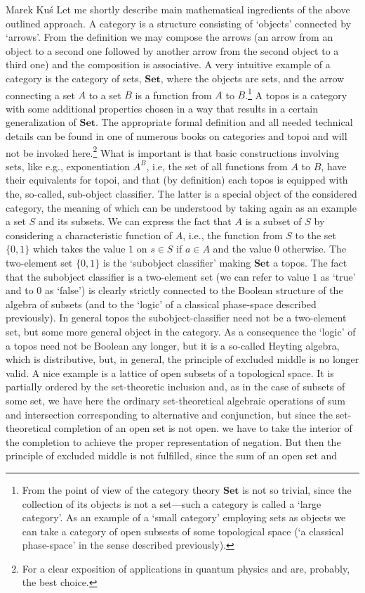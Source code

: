 \begin{artengenv}{Marek Ku\'s}
Let me shortly describe main mathematical ingredients of the above outlined approach. A category is a structure consisting of `objects' connected by `arrows'. From the definition we may compose the arrows (an arrow from an object to a second one followed by another arrow from the second object to a third one) and the composition is associative. A very intuitive example of a category is the category of sets, $\mathbf{Set}$, where the objects are sets, and the arrow connecting a set $A$ to a set $B$ is a function from $A$ to $B$.\footnote{From the point of view of the category theory $\mathbf{Set}$ is not so trivial, since the collection of its objects is not a set---such a category is called a `large category'. As an example of a `small category' employing sets as objects we can take a category of open subsests of some topological space (`a classical phase-space' in the sense described previously). } A topos is a category with some additional properties chosen in a way that results in a certain generalization of $\mathbf{Set}$. The appropriate formal definition and all needed technical details can be found in one of numerous books on categories and topoi \parencite[e.g.,][]{goldblatt_topoi_2014} and will not be invoked here.\footnote{For a clear exposition of applications in quantum physics \parencite{flori_first_2013} and \parencite{flori_second_2018} are, probably, the best choice.} What is important is that basic constructions involving sets, like e.g., exponentiation $A^B$, i.e, the set of all functions from $A$ to $B$, have their equivalents for topoi, and that (by definition) each topos is equipped with the, so-called, sub-object classifier. The latter is a special object of the considered category, the meaning of which can  be understood by taking again as an example a set $S$ and its subsets. We can express the fact that $A$ is a subset of $S$ by considering a characteristic function of $A$, i.e., the function from $S$ to the set $\{0,1\}$ which takes the value $1$ on $s\in S$ if $a\in A$ and the value $0$ otherwise. The two-element set $\{0,1\}$ is the `subobject classifier' making $\mathbf{Set}$ a topos. The fact that the subobject classifier is a two-element set (we can refer to value $1$ as `true' and to $0$ as `false') is clearly strictly connected to the Boolean structure of the algebra of subsets (and to the `logic' of a classical phase-space described previously). In general topos the subobject-classifier need not be a two-element set, but some more general object in the category. As a consequence the `logic' of a topos need not be Boolean any longer, but it is a so-called Heyting algebra, which is distributive, but, in general, the principle of excluded middle is no longer valid. A nice example is a lattice of open subsets of a topological space. It is partially ordered by the set-theoretic inclusion and, as in the case of subsets of some set, we have here the ordinary set-theoretical algebraic operations of sum and intersection corresponding to alternative and conjunction, but since the set-theoretical completion of an open set is not open. we have to take the interior of the completion to achieve the proper representation of negation. But then the principle of excluded middle is not fulfilled, since the sum of an open set and 
\end{artengenv}
